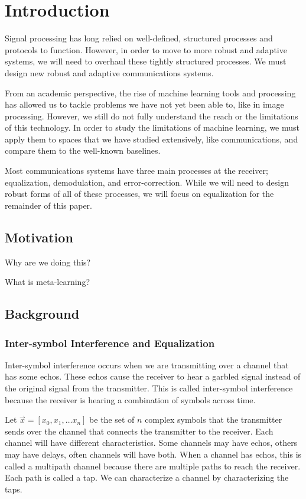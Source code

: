 \chapter{Introduction}

Signal processing has long relied on well-defined, structured processes and protocols to function.  However, in order to move to more robust and adaptive systems, we will need to overhaul these tightly structured processes.  We must design new robust and adaptive communications systems.

From an academic perspective, the rise of machine learning tools and processing has allowed us to tackle problems we have not yet been able to, like in image processing.  However, we still do not fully understand the reach or the limitations of this technology.  In order to study the limitations of machine learning, we must apply them to spaces that we have studied extensively, like communications, and compare them to the well-known baselines.

Most communications systems have three main processes at the receiver; equalization, demodulation, and error-correction.  While we will need to design robust forms of all of these processes, we will focus on equalization for the remainder of this paper. 

\section{Motivation}
Why are we doing this?

What is meta-learning?

\cite{finn}

\cite{lake}

\section{Background}

\subsection{Inter-symbol Interference and Equalization}

Inter-symbol interference occurs when we are transmitting over a channel that has some echos.  These echos cause the receiver to hear a garbled signal instead of the original signal from the transmitter.  This is called inter-symbol interference because the receiver is hearing a combination of symbols across time. 

Let $\vec{x}=[x_0, x_1, \ldots x_n]$ be the set of $n$ complex symbols that the transmitter sends over the channel that connects the transmitter to the receiver.
Each channel will have different characteristics. Some channels may have echos, others may have delays, often channels will have both.  When a channel has echos, this is called a multipath channel because there are multiple paths to reach the receiver.  Each path is called a tap.  We can characterize a channel by characterizing the taps.

